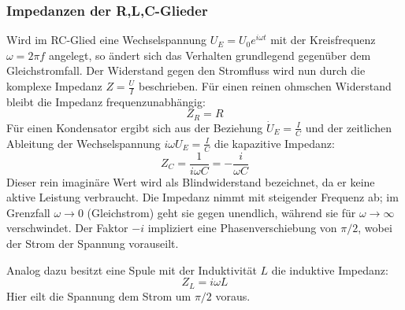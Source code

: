 \subsubsection{Impedanzen der R,L,C-Glieder}
Wird im RC-Glied eine Wechselspannung \(U_E = U_0 e^{i\omega t}\) mit der Kreisfrequenz \(\omega = 2\pi f\) angelegt, so ändert sich das Verhalten grundlegend gegenüber dem Gleichstromfall. Der Widerstand gegen den Stromfluss wird nun durch die komplexe Impedanz \(Z = \frac{U}{I}\) beschrieben. Für einen reinen ohmschen Widerstand bleibt die Impedanz frequenzunabhängig:
\begin{equation} \label{eq:imp_z} Z_R = R \end{equation}
Für einen Kondensator ergibt sich aus der Beziehung \(\dot{U}_E = \frac{I}{C}\) und der zeitlichen Ableitung der Wechselspannung \(i\omega U_E = \frac{I}{C}\) die kapazitive Impedanz:
\begin{equation} \label{eq:imp_c} Z_C = \frac{1}{i\omega C} = -\frac{i}{\omega C} \end{equation}
Dieser rein imaginäre Wert wird als Blindwiderstand bezeichnet, da er keine aktive Leistung verbraucht. Die Impedanz nimmt mit steigender Frequenz ab; im Grenzfall \(\omega \to 0\) (Gleichstrom) geht sie gegen unendlich, während sie für \(\omega \to \infty\) verschwindet. Der Faktor \(-i\) impliziert eine Phasenverschiebung von \(\pi/2\), wobei der Strom der Spannung vorauseilt.

Analog dazu besitzt eine Spule mit der Induktivität \(L\) die induktive Impedanz:
\begin{equation} \label{eq:imp_l} Z_L = i\omega L \end{equation}
Hier eilt die Spannung dem Strom um \(\pi/2\) voraus.

